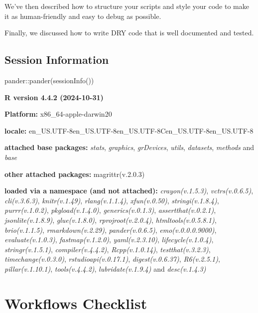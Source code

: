 \documentclass[
  letterpaper,
  DIV=11,
  numbers=noendperiod]{scrreprt}
\newenvironment{Shaded}{\begin{snugshade}}{\end{snugshade}}
\newcommand{\FunctionTok}[1]{\textcolor[rgb]{0.28,0.35,0.67}{#1}}
\newcommand{\NormalTok}[1]{\textcolor[rgb]{0.00,0.23,0.31}{#1}}
\newcommand{\SpecialCharTok}[1]{\textcolor[rgb]{0.37,0.37,0.37}{#1}}
\begin{document}
We've then described how to structure your scripts and style your code
to make it as human-friendly and easy to debug as possible.

Finally, we discussed how to write DRY code that is well documented and
tested.

\section{Session Information}\label{session-information-2}

\begin{Shaded}
\begin{Highlighting}[]
\NormalTok{pander}\SpecialCharTok{::}\FunctionTok{pander}\NormalTok{(}\FunctionTok{sessionInfo}\NormalTok{())}
\end{Highlighting}
\end{Shaded}

\textbf{R version 4.4.2 (2024-10-31)}

\textbf{Platform:} x86\_64-apple-darwin20

\textbf{locale:}
en\_US.UTF-8\textbar\textbar en\_US.UTF-8\textbar\textbar en\_US.UTF-8\textbar\textbar C\textbar\textbar en\_US.UTF-8\textbar\textbar en\_US.UTF-8

\textbf{attached base packages:} \emph{stats}, \emph{graphics},
\emph{grDevices}, \emph{utils}, \emph{datasets}, \emph{methods} and
\emph{base}

\textbf{other attached packages:} magrittr(v.2.0.3)

\textbf{loaded via a namespace (and not attached):}
\emph{crayon(v.1.5.3)}, \emph{vctrs(v.0.6.5)}, \emph{cli(v.3.6.3)},
\emph{knitr(v.1.49)}, \emph{rlang(v.1.1.4)}, \emph{xfun(v.0.50)},
\emph{stringi(v.1.8.4)}, \emph{purrr(v.1.0.2)}, \emph{pkgload(v.1.4.0)},
\emph{generics(v.0.1.3)}, \emph{assertthat(v.0.2.1)},
\emph{jsonlite(v.1.8.9)}, \emph{glue(v.1.8.0)},
\emph{rprojroot(v.2.0.4)}, \emph{htmltools(v.0.5.8.1)},
\emph{brio(v.1.1.5)}, \emph{rmarkdown(v.2.29)}, \emph{pander(v.0.6.5)},
\emph{emo(v.0.0.0.9000)}, \emph{evaluate(v.1.0.3)},
\emph{fastmap(v.1.2.0)}, \emph{yaml(v.2.3.10)},
\emph{lifecycle(v.1.0.4)}, \emph{stringr(v.1.5.1)},
\emph{compiler(v.4.4.2)}, \emph{Rcpp(v.1.0.14)},
\emph{testthat(v.3.2.3)}, \emph{timechange(v.0.3.0)},
\emph{rstudioapi(v.0.17.1)}, \emph{digest(v.0.6.37)},
\emph{R6(v.2.5.1)}, \emph{pillar(v.1.10.1)}, \emph{tools(v.4.4.2)},
\emph{lubridate(v.1.9.4)} and \emph{desc(v.1.4.3)}

\chapter*{Workflows Checklist}\label{workflows-checklist}
\end{document}
